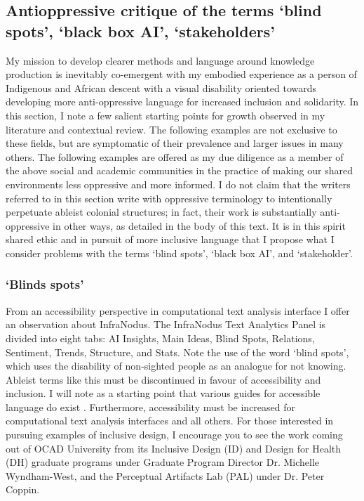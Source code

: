 \subsection{Antioppressive critique of the terms `blind spots’, `black box AI', `stakeholders’}
My mission to develop clearer methods and language around knowledge production is inevitably co-emergent with my embodied experience as a person of Indigenous and African descent with a visual disability oriented towards developing more anti-oppressive language for increased inclusion and solidarity. In this section, I note a few salient starting points for growth observed in my literature and contextual review. The following examples are not exclusive to these fields, but are symptomatic of their prevalence and larger issues in many others. The following examples are offered as my due diligence as a member of the above social and academic communities in the practice of making our shared environments less oppressive and more informed. I do not claim that the writers referred to in this section write with oppressive terminology to intentionally perpetuate ableist colonial structures; in fact, their work is substantially anti-oppressive in other ways, as detailed in the body of this text. It is in this spirit shared ethic and in pursuit of more inclusive language that I propose what I consider problems with the terms `blind spots’, `black box AI', and `stakeholder’. 

\subsubsection{`Blinds spots’}
From an accessibility perspective in computational text analysis interface I offer an observation about InfraNodus. The InfraNodus Text Analytics Panel is divided into eight tabs: AI Insights, Main Ideas, Blind Spots, Relations, Sentiment, Trends, Structure, and Stats. Note the use of the word `blind spots’, which uses the disability of non-sighted people as an analogue for not knowing. Ableist terms like this must be discontinued in favour of accessibility and inclusion. I will note as a starting point that various guides for accessible language do exist \citep{national_center_on_disability_and_journalism_ncdj_disability_nodate,ada_national_network_guidelines_nodate,university_of_utah_people_nodate}. Furthermore, accessibility must be increased for computational text analysis interfaces and all others. For those interested in pursuing examples of inclusive design, I encourage you to see the work coming out of OCAD University from its Inclusive Design (ID) and Design for Health (DH) graduate programs under Graduate Program Director Dr. Michelle Wyndham-West, and the Perceptual Artifacts Lab (PAL) under Dr. Peter Coppin.


